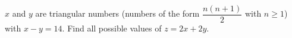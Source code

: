 $x$ and $y$ are triangular numbers (numbers of the form $\dfrac{n(n+1)}2$ with $n\ge1$) with $x-y=14$. Find all possible values of $z=2x+2y$.
